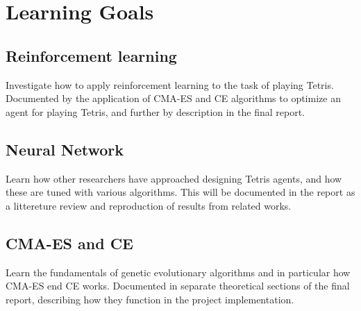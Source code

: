 \section*{Learning Goals}
\subsection*{Reinforcement learning}
Investigate how to apply reinforcement learning to the task of playing Tetris. Documented by the application of CMA-ES and CE algorithms to optimize an agent for playing Tetris, and further by description in the final report.

\subsection*{Neural Network}
Learn how other researchers have approached designing Tetris agents, and
how these are tuned with various algorithms. This will be documented in the 
report as a littereture review and reproduction of results from related works.

\subsection*{CMA-ES and CE}
Learn the fundamentals of genetic evolutionary algorithms
and in particular how CMA-ES end CE works. 
Documented in separate theoretical sections of the final report, 
describing how they function in the project implementation.